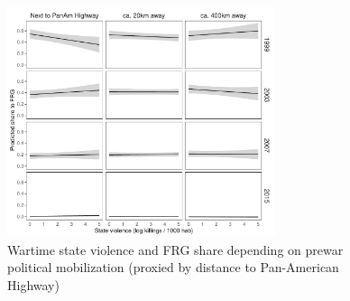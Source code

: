 \documentclass[a4paper, 12pt, notitlepage]{article}
\begin{document}
\begin{figure}[htb!]
  \centering
    \includegraphics[width = 0.7\textwidth]{img/pp_FRG_panam_year}

  \caption{Wartime state violence and FRG share depending on prewar political mobilization (proxied by distance to Pan-American Highway)} \label{fig:pp_FRG_panam_yrs}

\end{figure}
\end{document}
